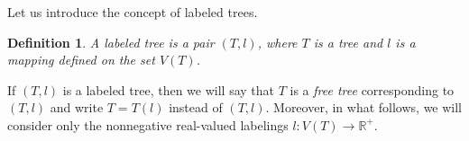 \documentclass[pdflatex,sn-mathphys-num]{sn-jnl}%
\newtheorem{definition}{Definition}%
\theoremstyle{thmstyletwo}%
\begin{document}

Let us introduce the concept of labeled trees.

\begin{definition}\label{d2.4}
A {\it labeled tree} is a pair \((T, l)\), where \(T\) is a tree and \(l\) is a mapping defined on the set \(V(T)\).
\end{definition}
If $(T,l)$ is a labeled tree, then we will say that \(T\) is a \emph{free tree} corresponding to \((T, l)\) and write \(T = T(l)\) instead of \((T, l)\). Moreover, in what follows, we will consider only the nonnegative real-valued labelings \(l\colon V(T)\to \mathbb R^{+}\).
\end{document}
